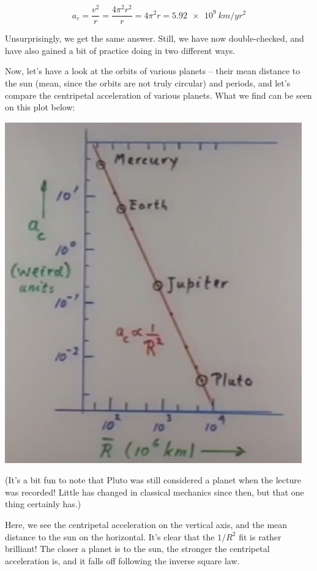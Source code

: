 \documentclass[8.01x]{subfiles}
\begin{document}
\begin{equation}
a_c = \frac{v^2}{r} = \frac{4 \pi^2 r^2}{r} = 4 \pi^2 r = \SI{5.92e9}{km/yr^2}
\end{equation}

Unsurprisingly, we get the same answer. Still, we have now double-checked, and have also gained a bit of practice doing in two different ways.

Now, let's have a look at the orbits of various planets -- their mean distance to the sun (mean, since the orbits are not truly circular) and periods, and let's compare the centripetal acceleration of various planets. What we find can be seen on this plot below:

\begin{center}
\includegraphics[scale=0.5]{Graphics/lec5_gravity_inverse_r2}
\end{center}

(It's a bit fun to note that Pluto was still considered a planet when the lecture was recorded! Little has changed in classical mechanics since then, but that one thing certainly has.)

Here, we see the centripetal acceleration on the vertical axis, and the mean distance to the sun on the horizontal. It's clear that the $1/R^2$ fit is rather brilliant! The closer a planet is to the sun, the stronger the centripetal acceleration is, and it falls off following the inverse square law.
\end{document}
